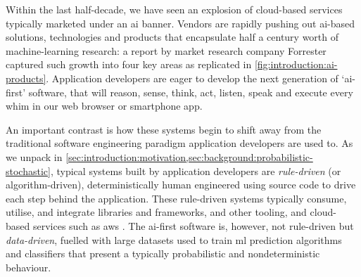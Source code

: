 \label{sec:introduction:preface}

Within the last half-decade, we have seen an explosion of cloud-based services typically marketed under an \gls{ai} banner. 
Vendors are rapidly pushing out \gls{ai}-based solutions, technologies and products that encapsulate half a century worth of machine-learning research: a \citeyear{LoGiudice:2016wf} report by market research company Forrester captured such growth into four key areas \citep{LoGiudice:2016wf} as replicated in  \cref{fig:introduction:ai-products}. 
Application developers are eager to develop the next generation of `\gls{ai}-first' software, that will reason, sense, think, act, listen, speak and execute every whim in our web browser or smartphone app.

An important contrast is how these systems begin to shift away from the traditional software engineering paradigm application developers are used to. As we unpack in \cref{sec:introduction:motivation,sec:background:probabilistic-stochastic}, typical systems built by application developers are \textit{rule-driven} (or algorithm-driven), deterministically human engineered using source code to drive each step behind the application. These rule-driven systems typically consume, utilise, and integrate libraries and frameworks,  and other tooling, and cloud-based services such as \gls{aws} \citep{AWS:Home}. The \gls{ai}-first software is, however, not rule-driven but \textit{data-driven}, fuelled with large datasets used to train \gls{ml} prediction algorithms and classifiers that present a typically probabilistic and nondeterministic behaviour.

